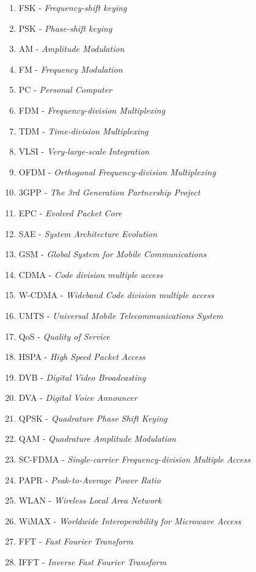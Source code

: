 \begin{enumerate}
	\item FSK - \textit{Frequency-shift keying}
	\item PSK - \textit{Phase-shift keying}
	\item AM - \textit{Amplitude Modulation}
	\item FM - \textit{Frequency Modulation}
	\item PC - \textit{Personal Computer}
	\item FDM - \textit{Frequency-division Multiplexing}
	\item TDM - \textit{Time-division Multiplexing}
	\item VLSI - \textit{Very-large-scale Integration}
	\item OFDM - \textit{Orthogonal Frequency-division Multiplexing}
	\item 3GPP - \textit{The 3rd Generation Partnership Project}
	\item EPC - \textit{Evolved Packet Core}
	\item SAE - \textit{System Architecture Evolution}
	\item GSM - \textit{Global System for Mobile Communications}
	\item CDMA - \textit{Code division multiple access}
	\item W-CDMA - \textit{Wideband Code division multiple access}
	\item UMTS - \textit{Universal Mobile Telecommunications System}
	\item QoS - \textit{Quality of Service}
	\item HSPA - \textit{High Speed Packet Access}
	\item DVB - \textit{Digital Video Broadcasting}
	\item DVA - \textit{Digital Voice Announcer}
	\item QPSK - \textit{Quadrature Phase Shift Keying}
	\item QAM - \textit{Quadrature Amplitude Modulation}
	\item SC-FDMA - \textit{Single-carrier Frequency-division Multiple Access}
	\item PAPR - \textit{Peak-to-Average Power Ratio}
	\item WLAN - \textit{Wireless Local Area Network}
	\item WiMAX - \textit{Worldwide Interoperability for Microwave Access}
	\item FFT - \textit{Fast Fourier Transform}
	\item IFFT - \textit{Inverse Fast Fourier Transform}

\end{enumerate}
